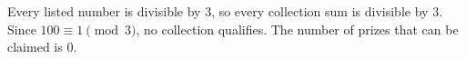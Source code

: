 Every listed number is divisible by $3$, so every collection sum is divisible by $3$. Since $100\equiv1\pmod3$, no collection qualifies. The number of prizes that can be claimed is $\boxed0$.
